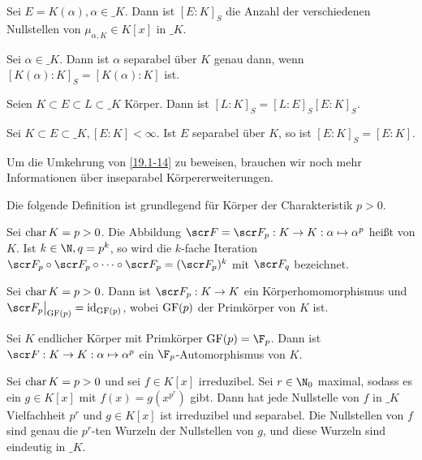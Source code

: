 \begin{lem} \label{19.1-11}
	Sei $E = K(\alpha), \alpha \in \_K$.
	Dann ist $[E : K]_S$ die Anzahl der verschiedenen Nullstellen von $\mu_{\alpha, K} \in K[x]$ in $\_K$.
\end{lem}

\begin{kor} \label{19.1-12}
	Sei $\alpha \in \_K$.
	Dann ist $\alpha$ separabel über $K$ genau dann, wenn $[K(\alpha) : K]_S = [K(\alpha) : K]$ ist.
\end{kor}

\begin{st} \label{19.1-13}
	Seien $K \subset E \subset L \subset \_K$ Körper.
	Dann ist $[L : K]_S = [L : E]_S [E : K]_S$.
\end{st}

\begin{lem} \label{19.1-14}
	Sei $K \subset E \subset \_K, [E : K] < \infty$.
	Ist $E$ separabel über $K$, so ist $[E : K]_S = [E : K]$.
\end{lem}

Um die Umkehrung von \ref{19.1-14} zu beweisen, brauchen wir noch mehr Informationen über inseparabel Körpererweiterungen.

Die folgende Definition ist grundlegend für Körper der Charakteristik $p > 0$.

\begin{df} \label{19.1-15}
	Sei $\operatorname{char} K = p > 0$.
	Die Abbildung $\scr F = \scr F_p: K \to K: \alpha \mapsto \alpha^p$ heißt  von $K$.
	Ist $k \in \N, q = p^k$, so wird die $k$-fache Iteration $\scr F_p \circ \scr F_p \circ \dotsb \circ \scr F_p = (\scr F_p)^k$ mit $\scr F_q$ bezeichnet.
\end{df}

\begin{st} \label{19.1-16}
	Sei $\operatorname{char} K = p > 0$.
	Dann ist $\scr F_p: K \to K$ ein Körperhomomorphismus und $\scr F_p\big|_{\GF(p)} = \id_{\GF(p)}$, wobei $\operatorname{GF}(p)$ der Primkörper von $K$ ist.
\end{st}

\begin{kor} \label{19.1-17}
	Sei $K$ endlicher Körper mit Primkörper $\GF(p) = \F_p$.
	Dann ist $\scr F: K \to K: \alpha \mapsto \alpha^p$ ein $\F_p$-Automorphismus von $K$.
\end{kor}

\begin{lem} \label{19.1-18}
	Sei $\operatorname{char} K = p > 0$ und sei $f \in K[x]$ irreduzibel.
	Sei $r \in \N_0$ maximal, sodass es ein $g \in K[x]$ mit $f(x) = g(x^{p^r})$ gibt.
	Dann hat jede Nullstelle von $f$ in $\_K$ Vielfachheit $p^r$ und $g \in K[x]$ ist irreduzibel und separabel.
	Die Nullstellen von $f$ sind genau die $p^r$-ten Wurzeln der Nullstellen von $g$, und diese Wurzeln sind eindeutig in $\_K$.
\end{lem}

